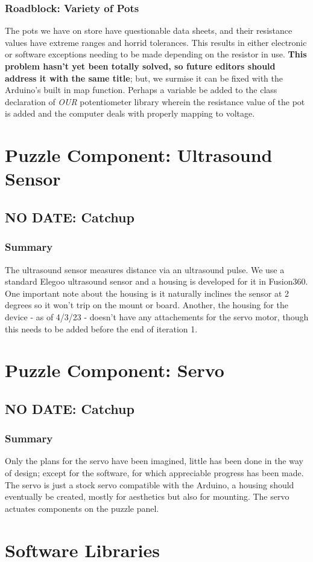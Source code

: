 \documentclass[a4paper, 10pt]{article}
\begin{document}
		\subsubsection{Roadblock: Variety of Pots}
		The pots we have on store have questionable data sheets, and their resistance values have extreme ranges and horrid tolerances. This results in either electronic or software exceptions needing to be made depending on the resistor in use. \textbf{This problem hasn't yet been totally solved, so future editors should address it with the same title}; but, we surmise it can be fixed with the Arduino's built in map function. Perhaps a variable be added to the class declaration of \textit{OUR} potentiometer library wherein the resistance value of the pot is added and the computer deals with properly mapping to voltage.
		
\section{Puzzle Component: Ultrasound Sensor}
	\subsection{NO DATE: Catchup}
		\subsubsection{Summary}
		The ultrasound sensor measures distance via an ultrasound pulse. We use a standard Elegoo ultrasound sensor and a housing is developed for it in Fusion360. One important note about the housing is it naturally inclines the sensor at 2 degrees so it won't trip on the mount or board. Another, the housing for the device - as of 4/3/23 -  doesn't have any attachements for the servo motor, though this needs to be added before the end of iteration 1.

\section{Puzzle Component: Servo}
	\subsection{NO DATE: Catchup}
		\subsubsection{Summary}
		Only the plans for the servo have been imagined, little has been done in the way of design; except for the software, for which appreciable progress has been made.  The servo is just a stock servo compatible with the Arduino, a housing should eventually be created, mostly for aesthetics but also for mounting. The servo actuates components on the puzzle panel.
		 
\section{Software Libraries}
		
\end{document}
